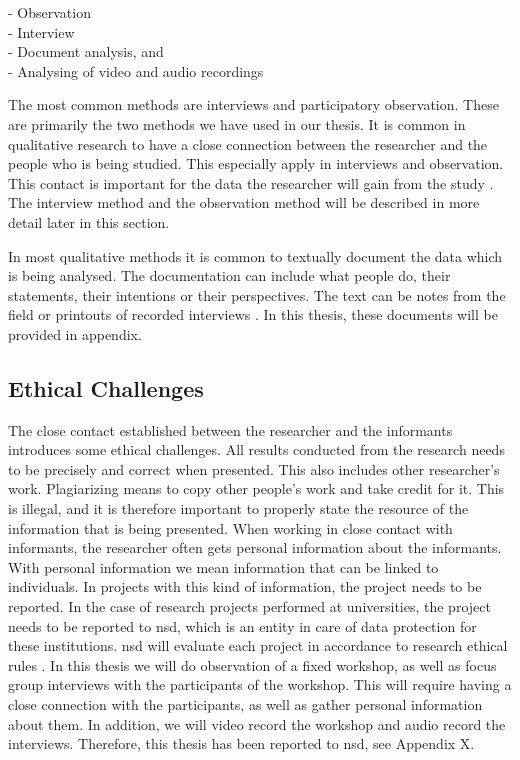 - Observation \\
- Interview \\ 
- Document analysis, and \\
- Analysing of video and audio recordings

The most common methods are interviews and participatory observation. These are primarily the two methods we have used in our thesis. It is common in qualitative research to have a close connection between the researcher and the people who is being studied. This especially apply in interviews and observation. This contact is important for the data the researcher will gain from the study \cite{qualitative}. The interview method and the observation method will be described in more detail later in this section.

In most qualitative methods it is common to textually document the data which is being analysed. The documentation can include what people do, their statements, their intentions or their perspectives. The text can be notes from the field or printouts of  recorded interviews \cite{qualitative}. In this thesis, these documents will be provided in appendix.

\subsection{Ethical Challenges}
The close contact established between the researcher and the informants introduces some ethical challenges. All results conducted from the research needs to be precisely and correct when presented. This also includes other researcher's work. Plagiarizing means to copy other people’s work and take credit for it. This is illegal, and it is therefore important to properly state the resource of the information that is being presented.  When working in close contact with informants, the researcher often gets personal information about the informants. With personal information we mean information that can be linked to individuals. In projects with this kind of information, the project needs to be reported. In the case of research projects performed at universities, the project needs to be reported to \ac{nsd}, which is an entity in care of data protection for these institutions. \ac{nsd} will evaluate each project in accordance to research ethical rules \cite{qualitative}. In this thesis we will do observation of a fixed workshop, as well as focus group interviews with the participants of the workshop. This will require having a close connection with the participants, as well as gather personal information about them. In addition, we will video record the workshop and audio record the interviews. Therefore, this thesis has been reported to \ac{nsd}, see Appendix X. 

